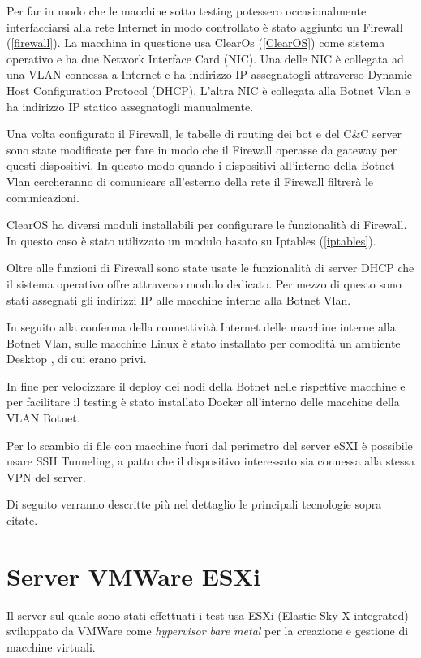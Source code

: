 Per far in modo che le macchine sotto testing potessero occasionalmente interfacciarsi alla rete Internet in modo controllato è stato aggiunto un Firewall (\ref{firewall}). La macchina in questione usa  ClearOs (\ref{ClearOS}) come sistema operativo e ha due Network Interface Card (NIC).
Una delle NIC è collegata ad una VLAN connessa a Internet e ha indirizzo IP assegnatogli attraverso Dynamic Host Configuration Protocol (DHCP). L'altra NIC è collegata alla Botnet Vlan e ha indirizzo IP statico assegnatogli manualmente. 

Una volta configurato il Firewall, le tabelle di routing dei bot e del C\&C server sono state modificate per fare in modo che il Firewall operasse da gateway per questi dispositivi. In questo modo quando i dispositivi all'interno della Botnet Vlan cercheranno di comunicare all'esterno della rete il Firewall filtrerà le comunicazioni.

ClearOS ha diversi moduli installabili per configurare le funzionalità di Firewall. In questo caso è stato utilizzato un modulo basato su Iptables (\ref{iptables}).
    
Oltre alle funzioni di Firewall sono state usate le funzionalità di server DHCP che il sistema operativo offre attraverso modulo dedicato. Per mezzo di  questo sono stati assegnati gli indirizzi IP alle macchine interne alla Botnet Vlan.

In seguito alla conferma della connettività  Internet delle macchine interne alla Botnet Vlan,  sulle macchine Linux è stato installato per comodità un ambiente Desktop , di cui erano privi.

In fine per velocizzare il deploy dei nodi della Botnet nelle rispettive macchine  e per facilitare il testing è stato installato Docker all'interno delle macchine della VLAN Botnet.

Per lo scambio di file con macchine fuori dal perimetro del server eSXI è possibile usare SSH Tunneling, a patto che il dispositivo interessato sia connessa alla stessa VPN del server.
    
Di seguito verranno descritte più nel dettaglio le principali tecnologie sopra citate.

\section{Server VMWare ESXi}
\label{esxi}
Il server sul quale sono stati effettuati i test usa  ESXi (Elastic Sky X integrated) \cite{esxi} sviluppato da VMWare come \emph{hypervisor bare metal} per la creazione e  gestione di macchine virtuali.


